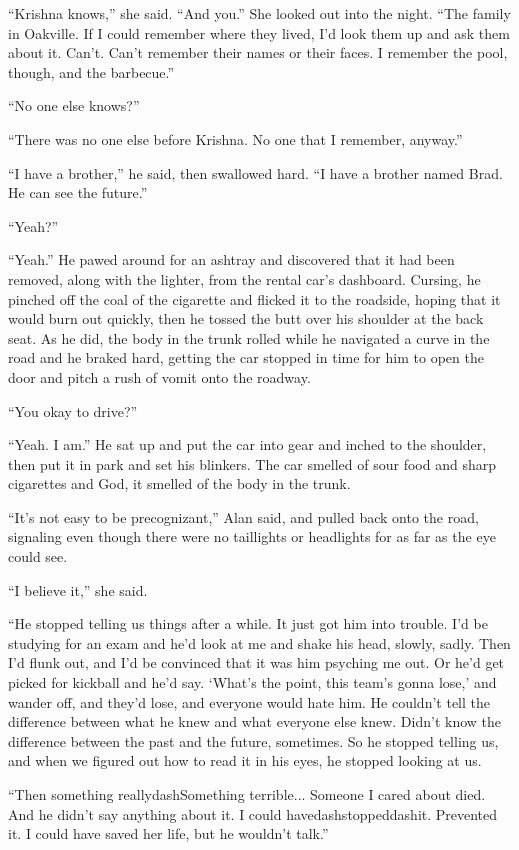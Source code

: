 ``Krishna knows,'' she said.  ``And you.'' She looked out into the
night.  ``The family in Oakville.  If I could remember where they
lived, I'd look them up and ask them about it.  Can't.  Can't remember
their names or their faces.  I remember the pool, though, and the
barbecue.''

``No one else knows?''

``There was no one else before Krishna.  No one that I remember,
anyway.''

``I have a brother,'' he said, then swallowed hard.  ``I have a
brother named Brad.  He can see the future.''

``Yeah?''

``Yeah.'' He pawed around for an ashtray and discovered that it had
been removed, along with the lighter, from the rental car's dashboard. 
Cursing, he pinched off the coal of the cigarette and flicked it to
the roadside, hoping that it would burn out quickly, then he tossed
the butt over his shoulder at the back seat.  As he did, the body in
the trunk rolled while he navigated a curve in the road and he braked
hard, getting the car stopped in time for him to open the door and
pitch a rush of vomit onto the roadway.

``You okay to drive?''

``Yeah.  I am.'' He sat up and put the car into gear and inched to the
shoulder, then put it in park and set his blinkers.  The car smelled
of sour food and sharp cigarettes and God, it smelled of the body in
the trunk.

``It's not easy to be precognizant,'' Alan said, and pulled back onto
the road, signaling even though there were no taillights or headlights
for as far as the eye could see.

``I believe it,'' she said.

``He stopped telling us things after a while.  It just got him into
trouble.  I'd be studying for an exam and he'd look at me and shake
his head, slowly, sadly.  Then I'd flunk out, and I'd be convinced
that it was him psyching me out.  Or he'd get picked for kickball and
he'd say.  `What's the point, this team's gonna lose,' and wander off,
and they'd lose, and everyone would hate him.  He couldn't tell the
difference between what he knew and what everyone else knew.  Didn't
know the difference between the past and the future, sometimes.  So he
stopped telling us, and when we figured out how to read it in his
eyes, he stopped looking at us.

``Then something reallydash{}Something terrible...  Someone I cared about
died.  And he didn't say anything about it.  I could
havedash{}stoppeddash{}it.  Prevented it.  I could have saved her life, but
he wouldn't talk.''

